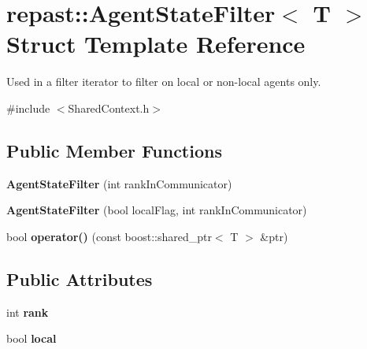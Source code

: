 \hypertarget{structrepast_1_1_agent_state_filter}{\section{repast\-:\-:Agent\-State\-Filter$<$ T $>$ Struct Template Reference}
\label{structrepast_1_1_agent_state_filter}
}


Used in a filter iterator to filter on local or non-\/local agents only.  




{\ttfamily \#include $<$Shared\-Context.\-h$>$}

\subsection*{Public Member Functions}
\begin{DoxyCompactItemize}
\item 
\hypertarget{structrepast_1_1_agent_state_filter_a82801260974c054c345260acc34ca171}{{\bfseries Agent\-State\-Filter} (int rank\-In\-Communicator)}\label{structrepast_1_1_agent_state_filter_a82801260974c054c345260acc34ca171}

\item 
\hypertarget{structrepast_1_1_agent_state_filter_a96347a73e49e4c152acec41dd4fc825e}{{\bfseries Agent\-State\-Filter} (bool local\-Flag, int rank\-In\-Communicator)}\label{structrepast_1_1_agent_state_filter_a96347a73e49e4c152acec41dd4fc825e}

\item 
\hypertarget{structrepast_1_1_agent_state_filter_aa21bb33c02f44ccc11b2e4acb69169a3}{bool {\bfseries operator()} (const boost\-::shared\-\_\-ptr$<$ T $>$ \&ptr)}\label{structrepast_1_1_agent_state_filter_aa21bb33c02f44ccc11b2e4acb69169a3}

\end{DoxyCompactItemize}
\subsection*{Public Attributes}
\begin{DoxyCompactItemize}
\item 
\hypertarget{structrepast_1_1_agent_state_filter_af37925d635ab1d25c4c3ac986e5f42c1}{int {\bfseries rank}}\label{structrepast_1_1_agent_state_filter_af37925d635ab1d25c4c3ac986e5f42c1}

\item 
\hypertarget{structrepast_1_1_agent_state_filter_a23bc35bb89617faaaf1fe20871c0b11c}{bool {\bfseries local}}\label{structrepast_1_1_agent_state_filter_a23bc35bb89617faaaf1fe20871c0b11c}

\end{DoxyCompactItemize}


